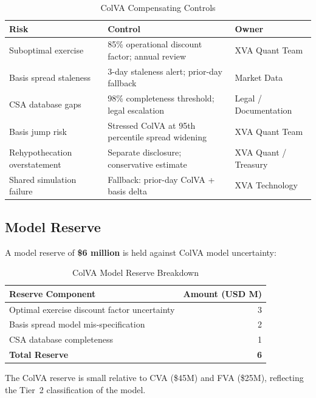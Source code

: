 \documentclass[11pt,a4paper]{article}
\begin{document}
\begin{table}[h!]
\centering
\caption{ColVA Compensating Controls}
\begin{tabular}{@{}p{4.5cm}p{6cm}p{3.5cm}@{}}
\toprule
\textbf{Risk} & \textbf{Control} & \textbf{Owner} \\
\midrule
Suboptimal exercise & 85\% operational discount factor; annual review & XVA Quant Team \\[4pt]
Basis spread staleness & 3-day staleness alert; prior-day fallback & Market Data \\[4pt]
CSA database gaps & 98\% completeness threshold; legal escalation & Legal / Documentation \\[4pt]
Basis jump risk & Stressed ColVA at 95th percentile spread widening & XVA Quant Team \\[4pt]
Rehypothecation overstatement & Separate disclosure; conservative estimate & XVA Quant / Treasury \\[4pt]
Shared simulation failure & Fallback: prior-day ColVA + basis delta & XVA Technology \\
\bottomrule
\end{tabular}
\end{table}

\subsection{Model Reserve}

A model reserve of \textbf{\$6 million} is held against ColVA model uncertainty:

\begin{table}[h!]
\centering
\caption{ColVA Model Reserve Breakdown}
\begin{tabular}{@{}lr@{}}
\toprule
\textbf{Reserve Component} & \textbf{Amount (USD M)} \\
\midrule
Optimal exercise discount factor uncertainty  & 3 \\
Basis spread model mis-specification          & 2 \\
CSA database completeness                     & 1 \\
\midrule
\textbf{Total Reserve}                        & \textbf{6} \\
\bottomrule
\end{tabular}
\end{table}

The ColVA reserve is small relative to CVA (\$45M) and FVA (\$25M), reflecting the Tier~2
classification of the model.
\end{document}
